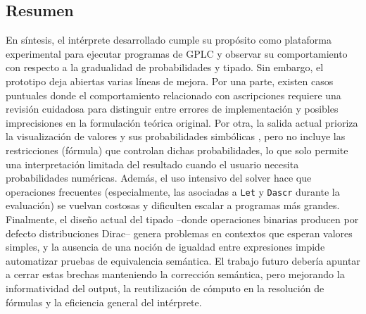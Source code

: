 \subsection{Resumen}\label{subsec:lim-resumen}

En síntesis, el intérprete desarrollado cumple su propósito como
plataforma experimental para ejecutar programas de GPLC y observar su
comportamiento con respecto a la gradualidad de probabilidades y
tipado. Sin embargo, el prototipo deja abiertas varias líneas de
mejora.  Por una parte, existen casos puntuales donde el
comportamiento relacionado con ascripciones requiere una
revisión cuidadosa para distinguir entre errores de implementación y
posibles imprecisiones en la formulación teórica original. Por otra,
la salida actual prioriza la visualización de valores y sus probabilidades simbólicas
, pero no incluye las restricciones (fórmula) que controlan
dichas probabilidades, lo que solo permite una interpretación limitada del
resultado cuando el usuario necesita probabilidades numéricas. Además,
el uso intensivo del solver hace que operaciones frecuentes
(especialmente, las asociadas a \lstinline|Let| y \lstinline|Dascr|
durante la evaluación) se vuelvan costosas y dificulten escalar a
programas más grandes. Finalmente, el diseño actual del tipado --donde
operaciones binarias producen por defecto distribuciones Dirac--
genera problemas en contextos que esperan valores simples, y la ausencia
de una noción de igualdad entre expresiones impide automatizar pruebas
de equivalencia semántica. El trabajo futuro debería apuntar a
cerrar estas brechas manteniendo la corrección semántica, pero
mejorando la informatividad del output, la reutilización de cómputo en
la resolución de fórmulas y la eficiencia general del intérprete.
